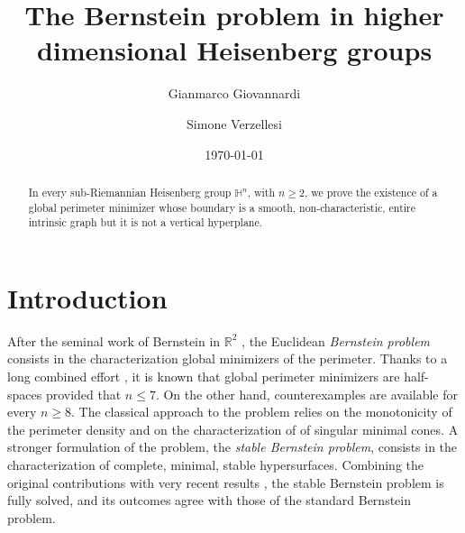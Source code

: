 \documentclass[11pt]{amsart}
\author[G. Giovannardi]{Gianmarco Giovannardi}
\author[S.~Verzellesi]{Simone Verzellesi}
\title[The Bernstein problem in higher dimensional Heisenberg groups]{The Bernstein problem in higher dimensional Heisenberg groups}
\date{\today}
\renewcommand{\leq}{\leqslant}
\renewcommand{\geq}{\geqslant}
\newcommand{\rr}{{\mathbb{R}}}
\theoremstyle{definition}
\theoremstyle{remark}
\numberwithin{equation}{section}
\begin{document}
\begin{abstract}
In every sub-Riemannian Heisenberg group $\mathbb H^n$, with $n\geq 2$, we prove the existence of a global perimeter minimizer whose boundary is a smooth, non-characteristic, entire intrinsic graph but it is not a vertical hyperplane. 
\end{abstract}
\maketitle


\section{Introduction}
After the seminal work of Bernstein in $\rr^2$ \cite{MR1544873}, the Euclidean \emph{Bernstein problem} consists in the characterization global minimizers of the perimeter. 
Thanks to a long combined effort \cite{MR200816,MR250205,MR178385,MR157263,MR233295}, it is known that global perimeter minimizers are half-spaces provided that $n\leq 7$. On the other hand, counterexamples are available for every $n\geq8$. 
The classical approach to the problem relies on the monotonicity of the perimeter density and on the characterization of of singular minimal cones. A stronger formulation of the problem, the \emph{stable Bernstein problem}, consists in the characterization of complete, minimal, stable hypersurfaces. Combining the original contributions \cite{MR546314,MR562550,MR630142,MR0423263} with very recent results \cite{MR4871955,MR4706440,MR4546104,MR4816633,MR5094441,hong2026stablebernsteintheoremmathbbr7,mazet2024stableminimalhypersurfacesmathbb}, the stable Bernstein problem is fully solved, and its outcomes agree with those of the standard Bernstein problem. 
\end{document}
